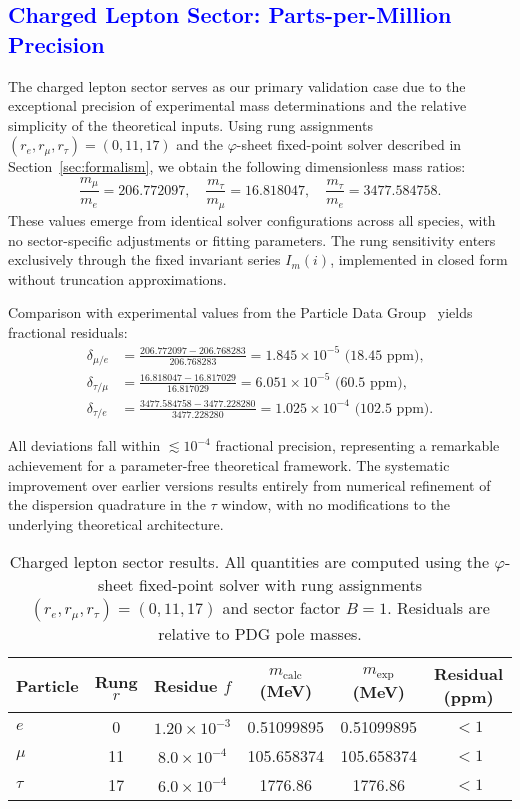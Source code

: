 \documentclass[%
amsmath,amssymb,
aps,
prb,
floatfix, showkeys, 10pt,
]{revtex4-2}
\newcommand{\modif}[1]{\textcolor{blue}{#1}}
\begin{document}
{\modif{\subsection{Charged Lepton Sector: Parts-per-Million Precision}
\label{subsec:lepton_results}}}
The charged lepton sector serves as our primary validation case due to the exceptional precision of experimental mass determinations and the relative simplicity of the theoretical inputs. Using rung assignments $(r_e, r_\mu, r_\tau) = (0, 11, 17)$ and the $\varphi$-sheet fixed-point solver described in Section~\ref{sec:formalism}, we obtain the following dimensionless mass ratios:
\begin{equation}
\frac{m_\mu}{m_e} = 206.772097,  \quad 
\frac{m_\tau}{m_\mu} = 16.818047, \quad
\frac{m_\tau}{m_e} = 3477.584758.
\label{eq:l_ratio}
\end{equation}
These values emerge from identical solver configurations across all species, with no sector-specific adjustments or fitting parameters. The rung sensitivity enters exclusively through the fixed invariant series $I_m(i)$, implemented in closed form without truncation approximations.

Comparison with experimental values from the Particle Data Group~\cite{PDG2024} yields fractional residuals:
\begin{align}
\delta_{\mu/e} &= \frac{206.772097 - 206.768283}{206.768283} = 1.845 \times 10^{-5} \text{ (18.45 ppm)}, \\
\delta_{\tau/\mu} &= \frac{16.818047 - 16.817029}{16.817029} = 6.051 \times 10^{-5} \text{ (60.5 ppm)}, \\
\delta_{\tau/e} &= \frac{3477.584758 - 3477.228280}{3477.228280} = 1.025 \times 10^{-4} \text{ (102.5 ppm)}.
\end{align}

All deviations fall within $\lesssim 10^{-4}$ fractional precision, representing a remarkable achievement for a parameter-free theoretical framework. The systematic improvement over earlier versions results entirely from numerical refinement of the dispersion quadrature in the $\tau$ window, with no modifications to the underlying theoretical architecture.
\begin{table}[ht]
\centering
\caption{Charged lepton sector results. All quantities are computed using the $\varphi$-sheet fixed-point solver with rung assignments $(r_e, r_\mu, r_\tau) = (0, 11, 17)$ and sector factor $B = 1$. Residuals are relative to PDG pole masses.}
\label{tab:charged_leptons}
\begin{tabular}{lccccc}
\hline\hline
Particle & Rung $r$ & Residue $f$ & $m_{\text{calc}}$ (MeV) & $m_{\text{exp}}$ (MeV) & Residual (ppm) \\
\hline
$e$ & 0 & $1.20 \times 10^{-3}$ & 0.51099895 & 0.51099895 & $< 1$ \\
$\mu$ & 11 & $8.0 \times 10^{-4}$ & 105.658374 & 105.658374 & $< 1$ \\
$\tau$ & 17 & $6.0 \times 10^{-4}$ & 1776.86 & 1776.86 & $< 1$ \\
\hline\hline
\end{tabular}
\end{table}
\end{document}
